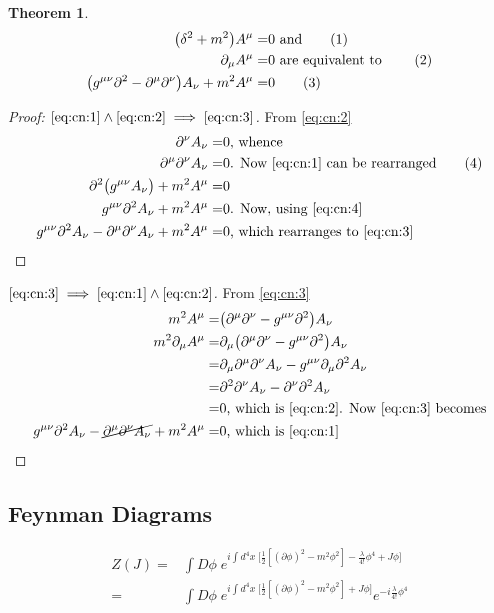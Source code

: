 \documentclass[]{article}
\newcommand\numberthis{\addtocounter{equation}{1}\tag{\theequation}}
\newtheorem{thm}{Theorem}
\begin{document}
\begin{thm}
	\begin{align*}
		\big(\delta^2+m^2\big) A^{\mu}=&0 \text{ and} \numberthis \label{eq:cn:1}\\
		 \partial_{\mu} A^{\mu}=&0 \text{ are equivalent to } \numberthis \label{eq:cn:2}\\
		 \big(g^{\mu\nu}\partial^2-\partial^\mu\partial^\nu\big)A_\nu + m^2 A^\mu=&0 \numberthis \label{eq:cn:3}
	\end{align*}
\end{thm}
\begin{proof}[Proof: $\eqref{eq:cn:1} \land \eqref{eq:cn:2} \implies \eqref{eq:cn:3}$]
	 From	\eqref{eq:cn:2} 
	\begin{align*}
		 \partial^\nu A_\nu =& 0 \text{, whence}\\
		 \partial^\mu \partial^\nu A_\nu =& 0 \text{. Now \eqref{eq:cn:1} can be rearranged} \numberthis \label{eq:cn:4}\\
		 \partial^2 \big(g^{\mu\nu}A_\nu\big) + m^2 A^\mu =&0\\
		 g^{\mu\nu} \partial^2 A_\nu + m^2 A^\mu =&0 \text{. Now, using \eqref{eq:cn:4}}\\
		 g^{\mu\nu} \partial^2 A_\nu - \partial^\mu \partial^\nu A_\nu + m^2 A^\mu =&0 \text{, which rearranges to \eqref{eq:cn:3}}
	\end{align*}
\end{proof}
\begin{proof}[$\eqref{eq:cn:3} \implies \eqref{eq:cn:1} \land \eqref{eq:cn:2}$]
	From \eqref{eq:cn:3}
	\begin{align*}
	 	m^2 A^\mu=&\big(\partial^\mu\partial^\nu-g^{\mu\nu}\partial^2\big)A_\nu \\
	 	m^2 \partial_\mu A^\mu =&\partial_\mu \big(\partial^\mu\partial^\nu-g^{\mu\nu}\partial^2\big)A_\nu\\
	 	=&\partial_\mu\partial^\mu\partial^\nu A_\nu -  g^{\mu\nu}\partial_\mu\partial^2A_\nu\\
	 	=&\partial^2\partial^\nu A_\nu - \partial^\nu\partial^2A_\nu\\
	 	=& 0 \text{, which is \eqref{eq:cn:2}. Now \eqref{eq:cn:3} becomes}\\
	 	g^{\mu\nu}\partial^2 A_\nu-\cancel{\partial^\mu\partial^\nu A_\nu} + m^2 A^\mu=&0 \text{, which is \eqref{eq:cn:1}}
	\end{align*}
\end{proof}

\subsection{Feynman Diagrams}

\begin{align*}
	Z(J) =& \int D\phi \; e^{i\int d^4x\;\big[\frac{1}{2}[(\partial \phi)^2-m^2\phi^2]-\frac{\lambda}{4!}\phi^4+J\phi\big]}\\
	=& \int D\phi \; e^{i\int d^4x\;\big[\frac{1}{2}[(\partial \phi)^2-m^2\phi^2]+J\phi\big]}e^{-i\frac{\lambda}{4!}\phi^4}
\end{align*}

\raggedright

\end{document}
